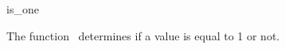 \begin{ccRefFunction}{is_one}

\ccDefinition

The function \ccRefName\ determines if a value is equal to 1 or not.


{}

\end{ccRefFunction}
